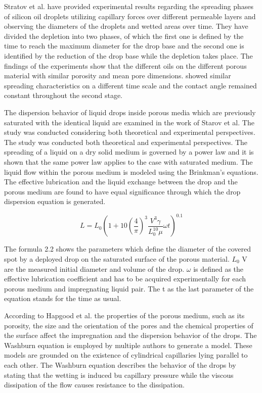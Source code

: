 Stratov et al. have provided experimental results regarding  the spreading phases of silicon oil droplets utilizing capillary forces over different permeable layers and observing the diameters of the droplets and wetted areas over time. They have divided the depletion into two phases, of which the first one is defined by the time to reach the maximum diameter for the drop base and the second one is identified by the reduction of the drop base while the depletion takes place. The findings of the experiments show that the different oils on the different porous material with similar porosity and mean pore dimensions. showed similar spreading characteristics on a different time scale and the contact angle remained constant throughout the second stage.\citep{starov2002thick}

The dispersion behavior of liquid drops inside porous media which are previously saturated with the identical liquid are examined in the work of Starov et al. The study was conducted considering both theoretical and experimental perspectives. The study was conducted both theoretical and experimental perspectives. The spreading of a liquid on a dry solid medium is governed by a power law and it is shown that the same power law applies to the case with saturated medium. The liquid flow within the porous medium is modeled using the Brinkman’s equations. The effective lubrication and the liquid exchange between the drop and the porous medium are found to have equal significance through which the drop dispersion equation is generated. \citep{starov2002saturated}
\newline

\begin{equation}
L=L_0 (1+10(\frac{4}{\pi})^3 \frac{V^3 \gamma}{L_0^{10} \mu}\omega t)^{0.1}
\end{equation}
\newline

The formula 2.2 shows the parameters which define the diameter of the covered spot by a deployed drop on the saturated surface of the porous material. $L_0$ V are the measured initial diameter and volume of the drop. $\omega$ is defined as the effective lubrication coefficient and has to be acquired experimentally for each porous medium and impregnating liquid pair. The t as the last parameter of the equation stands for the time as usual. 

According to Hapgood et al. the properties of the porous medium, such as its porosity, the size and the orientation of the pores and the chemical properties of the surface affect the impregnation and the dispersion behavior of the drops. The Washburn equation is employed by multiple authors to generate a model. These models are grounded on the existence of cylindrical capillaries lying parallel to each other. The Washburn equation describes the behavior of the drops by stating that the wetting is induced bu capillary pressure while the viscous dissipation of the flow causes resistance to the dissipation.

